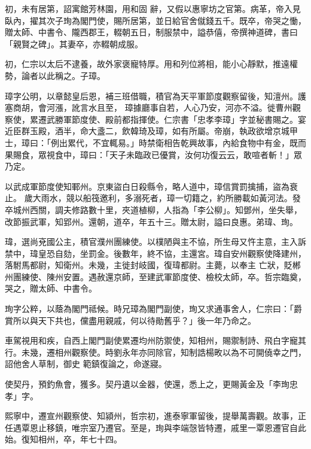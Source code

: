 \begin{pinyinscope}
 初，未有居第，詔寓館芳林園，用和固
 辭，又假以惠寧坊之官第。病革，帝入見臥內，擢其次子珣為閣門使，賜所居第，並日給官舍僦錢五千。既卒，帝哭之慟，贈太師、中書令、隴西郡王，輟朝五日，制服禁中，謚恭僖，帝撰神道碑，書曰「親賢之碑」。其妻卒，亦輟朝成服。



 初，仁宗以太后不逮養，故外家褒寵特厚。用和列位將相，能小心靜默，推遠權勢，論者以此稱之。子璋。



 璋字公明，以章懿皇后恩，補三班借職，積官為天平軍節度觀察留後，知澶州。護塞商胡，會河漲，訛言水且至，
 璋據廳事自若，人心乃安，河亦不溢。徙曹州觀察使，累遷武勝軍節度使、殿前都指揮使。仁宗書「忠孝李璋」字並秘書賜之。宴近臣群玉殿，酒半，命大盞二，飲韓琦及璋，如有所屬。帝崩，執政欲增京城甲士，璋曰：「例出累代，不宜輒易。」時禁衛相告乾興故事，內給食物中有金，既而果賜食，眾視食中，璋曰：「天子未臨政已優賞，汝何功復云云，敢喧者斬！」眾乃定。



 以武成軍節度使知鄆州。京東盜白日殺縣令，略人道中，璋信賞罰擒捕，盜為衰止。
 歲大雨水，競以船筏邀利，多溺死者，璋一切籍之，約所勝載如黃河法。發卒城州西關，調夫修路數十里，夾道植柳，人指為「李公柳」。知鄧州，坐失舉，改節振武軍，知郢州。還朝，道卒，年五十三。贈太尉，謚曰良惠。弟瑋、珣。



 瑋，選尚兗國公主，積官濮州團練使。以樸陋與主不協，所生母又忤主意，主入訴禁中，瑋皇恐自劾，坐罰金。後數年，終不協，主還宮。瑋自安州觀察使降建州，落駙馬都尉，知衛州。未幾，主徙封岐國，復瑋都尉。主薨，以奉主
 亡狀，貶郴州團練使、陳州安置。遇赦還京師，至建武軍節度使、檢校太師，卒。哲宗臨奠，哭之，贈太師、中書令。



 珣字公粹，以蔭為閣門祗候。時兄璋為閣門副使，珣又求通事舍人，仁宗曰：「爵賞所以與天下共也，儻盡用親戚，何以待勛舊乎？」後一年乃命之。



 車駕視用和疾，自西上閣門副使累遷均州防禦使，知相州，賜禦制詩、飛白字寵其行。未幾，遷相州觀察使。時劉永年亦同除官，知制誥楊畋以為不可開僥幸之門，詔他舍人草制，御史
 範鎮復論之，命遂寢。



 使契丹，預釣魚會，獲多。契丹遺以金器，使還，悉上之，更賜黃金及「李珣忠孝」字。



 熙寧中，遷宣州觀察使、知潁州，哲宗初，進泰寧軍留後，提舉萬壽觀。故事，正任遇覃恩止移鎮，唯宗室乃遷官。至是，珣與李端愨皆特遷，戚里一覃恩遷官自此始。復知相州，卒，年七十四。




\end{pinyinscope}
